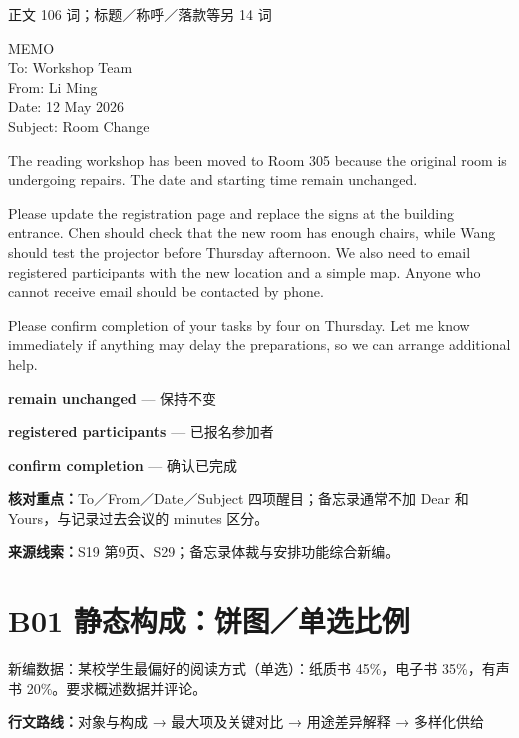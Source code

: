 \documentclass[11pt,a4paper,fontset=macnew]{ctexart}
\newenvironment{example}{\begingroup\fontsize{11}{14.3}\selectfont\setlength{\parskip}{4pt}}{\par\endgroup}
\begin{document}
{\small 正文 106 词；标题／称呼／落款等另 14 词}\par
\begin{example}
\noindent MEMO\\To: Workshop Team\\From: Li Ming\\Date: 12 May 2026\\Subject: Room Change\par
The reading workshop has been moved to Room 305 because the original room is undergoing repairs. The date and starting time remain unchanged.

Please update the registration page and replace the signs at the building entrance. Chen should check that the new room has enough chairs, while Wang should test the projector before Thursday afternoon. We also need to email registered participants with the new location and a simple map. Anyone who cannot receive email should be contacted by phone.

Please confirm completion of your tasks by four on Thursday. Let me know immediately if anything may delay the preparations, so we can arrange additional help.

\end{example}
\par\vspace{4pt}{\bfseries 好词好句：优先记这三处}\par\nopagebreak
{\small\textbf{remain unchanged} — 保持不变}\par
{\small\textbf{registered participants} — 已报名参加者}\par
{\small\textbf{confirm completion} — 确认已完成}\par
{\small\textbf{核对重点：}To／From／Date／Subject 四项醒目；备忘录通常不加 Dear 和 Yours，与记录过去会议的 minutes 区分。}\par
{\fontsize{8}{10}\selectfont\textbf{来源线索：}S19 第9页、S29；备忘录体裁与安排功能综合新编。}\par
\clearpage\section*{B01  静态构成：饼图／单选比例}
{\small 新编数据：某校学生最偏好的阅读方式（单选）：纸质书 45\%，电子书 35\%，有声书 20\%。要求概述数据并评论。}\par
{\small\textbf{行文路线：}对象与构成 → 最大项及关键对比 → 用途差异解释 → 多样化供给}\par
\end{document}
